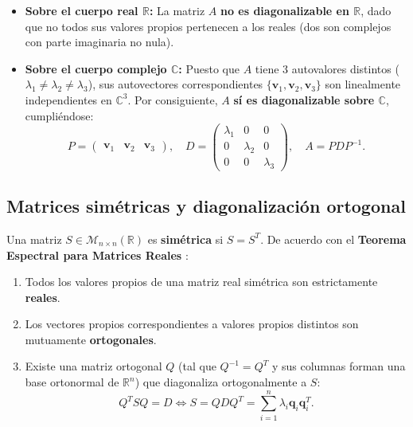\documentclass[spanish,letterpaper,oneside]{article}
\begin{document}
\begin{itemize}
\item \textbf{Sobre el cuerpo real $\mathbb{R}$:} La matriz $A$ \textbf{no es diagonalizable en $\mathbb{R}$}, dado que no todos sus valores propios pertenecen a los reales (dos son complejos con parte imaginaria no nula).
\item \textbf{Sobre el cuerpo complejo $\mathbb{C}$:} Puesto que $A$ tiene 3 autovalores distintos ($\lambda_1 \neq \lambda_2 \neq \lambda_3$), sus autovectores correspondientes $\{\mathbf{v}_1, \mathbf{v}_2, \mathbf{v}_3\}$ son linealmente independientes en $\mathbb{C}^3$. Por consiguiente, $A$ \textbf{sí es diagonalizable sobre $\mathbb{C}$}, cumpliéndose:
\begin{equation}
P = \begin{pmatrix} \mathbf{v}_1 & \mathbf{v}_2 & \mathbf{v}_3 \end{pmatrix}, \quad
D = \begin{pmatrix} \lambda_1 & 0 & 0 \\ 0 & \lambda_2 & 0 \\ 0 & 0 & \lambda_3 \end{pmatrix}, \quad A = P D P^{-1}.
\end{equation}
\end{itemize}

\subsection{Matrices simétricas y diagonalización ortogonal}
Una matriz $S \in \mathcal{M}_{n \times n}(\mathbb{R})$ es \textbf{simétrica} si $S = S^T$. De acuerdo con el \textbf{Teorema Espectral para Matrices Reales} \citep{anton2014,strang2016}:
\begin{enumerate}
\item Todos los valores propios de una matriz real simétrica son estrictamente \textbf{reales}.
\item Los vectores propios correspondientes a valores propios distintos son mutuamente \textbf{ortogonales}.
\item Existe una matriz ortogonal $Q$ (tal que $Q^{-1} = Q^T$ y sus columnas forman una base ortonormal de $\mathbb{R}^n$) que diagonaliza ortogonalmente a $S$:
\begin{equation}
Q^T S Q = D \iff S = Q D Q^T = \sum_{i=1}^n \lambda_i \mathbf{q}_i \mathbf{q}_i^T.
\end{equation}
\end{enumerate}
\end{document}
